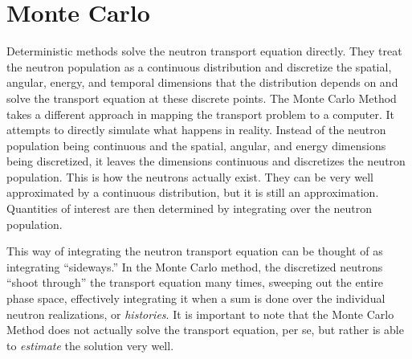 
\section{Monte Carlo}
\label{sec:MC}

Deterministic methods solve the neutron transport equation directly.  They treat the neutron population as a continuous distribution and discretize the spatial, angular, energy, and temporal dimensions that the distribution depends on and solve the transport equation at these discrete points.  The Monte Carlo Method takes a different approach in mapping the transport problem to a computer.  It attempts to directly simulate what happens in reality.  Instead of the neutron population being continuous and the spatial, angular, and energy dimensions being discretized, it leaves the dimensions continuous and discretizes the neutron population.  This is how the neutrons actually exist.  They can be very well approximated by a continuous distribution, but it is still an approximation.  Quantities of interest are then determined by integrating over the neutron population.   

This way of integrating the neutron transport equation can be thought of as integrating ``sideways.''  In the Monte Carlo method, the discretized neutrons ``shoot through'' the transport equation many times, sweeping out the entire phase space, effectively integrating it when a sum is done over the individual neutron realizations, or \emph{histories}.  It is important to note that the Monte Carlo Method does not actually solve the transport equation, per se, but rather is able to \emph{estimate} the solution very well.

